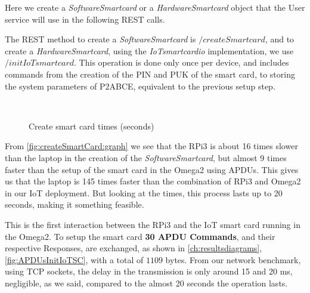 \documentclass[journal]{IEEEtran}
\begin{document}
Here we create a \textit{SoftwareSmartcard} or a \textit{HardwareSmartcard} object that the User service will use in the following REST calls.

The REST method to create a \textit{SoftwareSmartcard} is $/createSmartcard$, and to create a \textit{HardwareSmartcard}, using the \textit{IoTsmartcardio} implementation, we use $/initIoTsmartcard$. This operation is done only once per device, and includes commands from the creation of the PIN and PUK of the smart card, to storing the system parameters of P2ABCE, equivalent to the previous setup step.


\begin{figure}[bth]
	\myfloatalign
	 \quad
	 \\
	\caption{Create smart card times (seconds)}
	\label{fig:createSmartCard:graph}
\end{figure}

From \autoref{fig:createSmartCard:graph} we see that the RPi3 is about 16 times slower than the laptop in the creation of the \textit{SoftwareSmartcard}, but almost 9 times faster than the setup of the smart card in the Omega2 using APDUs. This gives us that the laptop is 145 times faster than the combination of RPi3 and Omega2 in our IoT deployment.
But looking at the times, this process lasts up to 20 seconds, making it something feasible.

This is the first interaction between the RPi3 and the IoT smart card running in the Omega2. To setup the smart card \textbf{30 APDU Commands}, and their respective Responses, are exchanged, as shown in \autoref{ch:resultsdiagrams}, \autoref{fig:APDUsInitIoTSC}, with a total of $1109$ bytes. From our network benchmark, using TCP sockets, the delay in the transmission is only around 15 and 20 ms, negligible, as we said, compared to the almost 20 seconds the operation lasts.
\end{document}
